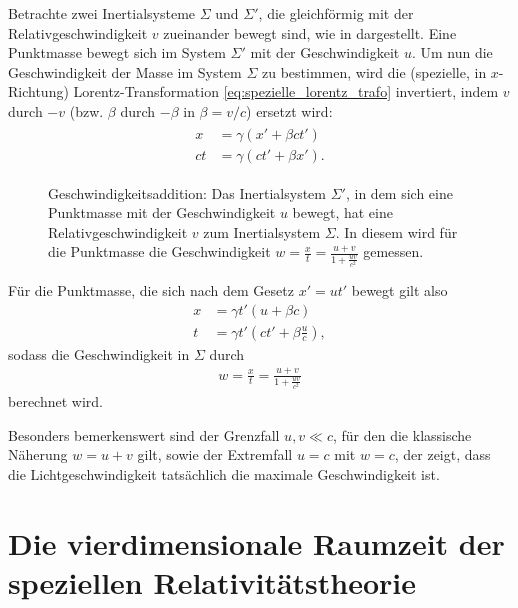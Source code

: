 Betrachte zwei Inertialsysteme $\Sigma$ und $\Sigma'$, die gleichförmig mit der Relativgeschwindigkeit  $v$ zueinander bewegt sind, wie in  dargestellt.
Eine Punktmasse bewegt sich im System $\Sigma'$ mit der Geschwindigkeit $u$.
Um nun die Geschwindigkeit der Masse im System $\Sigma$ zu bestimmen, wird die (spezielle, in $x$-Richtung) Lorentz-Transformation
\eqref{eq:spezielle_lorentz_trafo} invertiert, indem $v$ durch $-v$ (bzw. $\beta$ durch $-\beta$ in $\beta=v/c$) ersetzt wird:
\begin{align}
    \label{eq:spezielle_inv_lorentz_trafo}
    \begin{split}
        x  & =\gamma(x'+\beta ct') \\
        ct & =\gamma(ct'+\beta x').
    \end{split}
\end{align}
\begin{figure}[htp]
    \centering
    \tfigAdditionOfVelocities
    \caption{Geschwindigkeitsaddition: Das Inertialsystem $\Sigma'$, in dem sich eine Punktmasse mit der Geschwindigkeit $u$ bewegt, hat eine Relativgeschwindigkeit $v$ zum Inertialsystem $\Sigma$. In diesem wird für die Punktmasse die Geschwindigkeit $w=\frac{x}{t}=\frac{u+v}{1+\frac{uv}{c^2}}$ gemessen. }
    \label{fig:Geschwindigkeitsaddition}
\end{figure}

Für die Punktmasse, die sich nach dem Gesetz $x'=ut'$ bewegt gilt also
\begin{align*}
    x & =\gamma t'(u+\beta c)              \\
    t & =\gamma t'(ct'+\beta \frac{u}{c}),
\end{align*}
sodass die Geschwindigkeit in $\Sigma$ durch
\begin{align*}
    w=\frac{x}{t}=\frac{u+v}{1+\frac{uv}{c^2}}
\end{align*}
berechnet wird.

Besonders bemerkenswert sind der Grenzfall $u,v\ll c$, für den die klassische Näherung $w=u+v$ gilt, sowie der Extremfall $u=c$ mit $w=c$, der zeigt, dass die Lichtgeschwindigkeit tatsächlich die maximale Geschwindigkeit ist.




\section{Die vierdimensionale Raumzeit der speziellen Relativitätstheorie}

